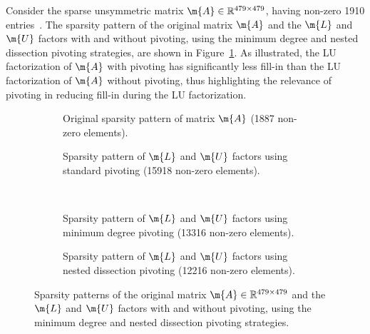 \begin{example}
  Consider the  sparse unsymmetric matrix $\m{A} \in \mathbb{R}^{479 \times 479}$, having non-zero 1910 entries~\cite{matlab}. The sparsity pattern of the original matrix $\m{A}$ and the $\m{L}$ and $\m{U}$ factors with and without pivoting, using the minimum degree and nested dissection pivoting strategies, are shown in Figure~\ref{chap2:fig:sparsity_patterns}. As illustrated, the \ac{LU} factorization of $\m{A}$ with pivoting has significantly less fill-in than the \ac{LU} factorization of $\m{A}$ without pivoting, thus highlighting the relevance of pivoting in reducing fill-in during the \ac{LU} factorization.
  \begin{figure}[!htb] %
    \centering
    \begin{subfigure}[t]{0.45\textwidth}
      \centering
      \caption{Original sparsity pattern of matrix $\m{A}$ (1887 non-zero elements).}
    \end{subfigure}%
    \hfill%
    \begin{subfigure}[t]{0.45\textwidth}
      \centering
      \caption{Sparsity pattern of $\m{L}$ and $\m{U}$ factors using standard pivoting (15918 non-zero elements).}
    \end{subfigure} \\[1.0em]
    \begin{subfigure}[t]{0.45\textwidth}
      \centering
      \caption{Sparsity pattern of $\m{L}$ and $\m{U}$ factors using minimum degree pivoting (13316 non-zero elements).}
    \end{subfigure}%
    \hfill%
    \begin{subfigure}[t]{0.45\textwidth}
      \centering
      \caption{Sparsity pattern of $\m{L}$ and $\m{U}$ factors using nested dissection pivoting (12216 non-zero elements).}
    \end{subfigure}
    \caption{Sparsity patterns of the original  matrix $\m{A} \in \mathbb{R}^{479 \times 479}$ and the $\m{L}$ and $\m{U}$ factors with and without pivoting, using the minimum degree and nested dissection pivoting strategies.}
    \label{chap2:fig:sparsity_patterns}
  \end{figure}
\end{example}

